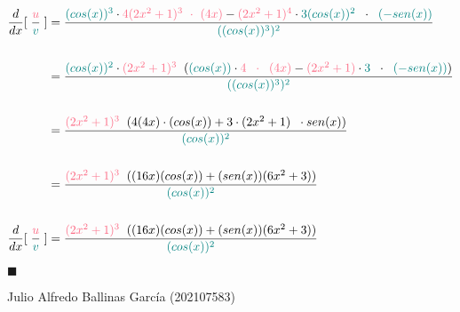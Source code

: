 \documentclass[12pt]{article}
\renewcommand{\qedsymbol}{$\blacksquare$}
\begin{document}
\begin{equation*}
    \begin{split}
           \frac{d}{dx} {\LARGE[}\hspace{0.1cm}{\LARGE{\frac{{\textcolor{wildwatermelon}{u}}}{{\textcolor{tealgreen}{v}}}}} \hspace{0.1cm} {\LARGE{]}} & = \frac{ {\textcolor{tealgreen}{(cos(x))^{3}}} \cdot  {\textcolor{wildwatermelon}{{4(2x^{2}+1)^{3}} \hspace{0.2cm} {\bf{\cdot}} \hspace{0.2cm} (4x)} } - {\textcolor{wildwatermelon}{{(2x^{2}+1)^{4}}}} \cdot {\textcolor{tealgreen}{3(cos(x))^{2}}} \hspace{0.2cm} \cdot\hspace{0.2cm}  {{\textcolor{tealgreen}{(-sen(x))}}}}{{\textcolor{tealgreen}{((cos(x))^{3})^{2}}}} \\\\ 
        & = \frac{ {\textcolor{tealgreen}{(cos(x))^{2}}}\cdot {\textcolor{wildwatermelon}{{(2x^{2}+1)^{3}}}} \hspace{0.2cm} ( {\textcolor{tealgreen}{(cos(x))}}\cdot{\textcolor{wildwatermelon}{{4} \hspace{0.2cm} \cdot \hspace{0.2cm} (4x)} } - {\textcolor{wildwatermelon}{{(2x^{2}+1)}}} \cdot {\textcolor{tealgreen}{3}} \hspace{0.2cm} \cdot \hspace{0.2cm}  {{\textcolor{tealgreen}{(-sen(x))}}})}{{\textcolor{tealgreen}{((cos(x))^{3})^{2}}}} \\\\
         & = \frac{ {\textcolor{wildwatermelon}{{(2x^{2}+1)^{3}}}} \hspace{0.2cm} ( 4(4x) \cdot (cos(x))+  3 \cdot (2x^{2}+1) \hspace{0.2cm} \cdot sen(x))}{{\textcolor{tealgreen}{(cos(x))^{2}}}}\\\\ 
         & =\frac{ {\textcolor{wildwatermelon}{{(2x^{2}+1)^{3}}}} \hspace{0.2cm} (( 16x)(cos(x)) +  (sen(x))(6x^{2}+3) )}{{\textcolor{tealgreen}{(cos(x))^{2}}}}\\\\
        \frac{d}{dx} {\LARGE[}\hspace{0.1cm}{\LARGE{\frac{{\textcolor{wildwatermelon}{u}}}{{\textcolor{tealgreen}{v}}}}} \hspace{0.1cm} {\LARGE{]}} & = \frac{ {\textcolor{wildwatermelon}{{(2x^{2}+1)^{3}}}} \hspace{0.2cm} (( 16x)(cos(x)) +  (sen(x))(6x^{2}+3) )}{{\textcolor{tealgreen}{(cos(x))^{2}}}}
    \end{split}
    \end{equation*} \vspace{1cm} 

\hspace{9cm} {{\qedsymbol}}  \vspace{2cm}



\hspace{9cm}\textsf{Julio Alfredo Ballinas García (202107583)}



 
\end{document}
